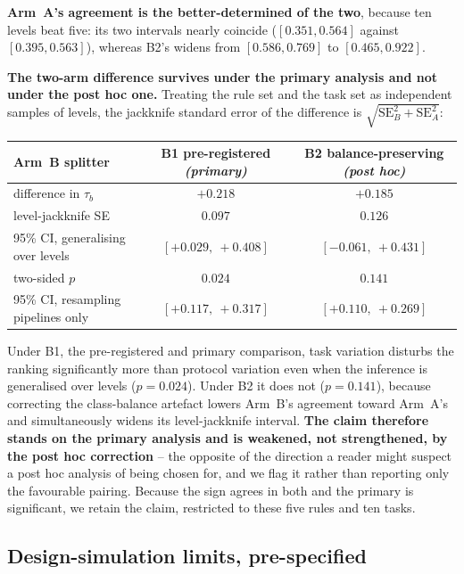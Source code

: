 \documentclass[11pt,a4paper]{article}
\begin{document}
\textbf{Arm~A's agreement is the better-determined of the two}, because ten levels beat
five: its two intervals nearly coincide ($[0.351, 0.564]$ against $[0.395, 0.563]$),
whereas B2's widens from $[0.586, 0.769]$ to $[0.465, 0.922]$.

\textbf{The two-arm difference survives under the primary analysis and not under the post
hoc one.} Treating the rule set and the task set as independent samples of levels, the
jackknife standard error of the difference is $\sqrt{\mathrm{SE}_B^2 + \mathrm{SE}_A^2}$:

\begin{center}\small
\begin{tabular}{lcc}
\toprule
Arm~B splitter & \textbf{B1} pre-registered \emph{(primary)} & B2 balance-preserving \emph{(post hoc)} \\
\midrule
difference in $\tau_b$                  & $+0.218$ & $+0.185$ \\
level-jackknife SE                      & $0.097$  & $0.126$ \\
95\% CI, generalising over levels       & $[+0.029,\ +0.408]$ & $[-0.061,\ +0.431]$ \\
two-sided $p$                           & $\mathbf{0.024}$ & $0.141$ \\
\midrule
95\% CI, resampling pipelines only      & $[+0.117,\ +0.317]$ & $[+0.110,\ +0.269]$ \\
\bottomrule
\end{tabular}
\end{center}

\noindent Under B1, the pre-registered and primary comparison, task variation disturbs the
ranking significantly more than protocol variation even when the inference is generalised
over levels ($p = 0.024$). Under B2 it does not ($p = 0.141$), because correcting the
class-balance artefact lowers Arm~B's agreement toward Arm~A's and simultaneously widens
its level-jackknife interval. \textbf{The claim therefore stands on the primary analysis
and is weakened, not strengthened, by the post hoc correction} -- the opposite of the
direction a reader might suspect a post hoc analysis of being chosen for, and we flag it
rather than reporting only the favourable pairing. Because the sign agrees in both and the
primary is significant, we retain the claim, restricted to these five rules and ten tasks.

\subsection{Design-simulation limits, pre-specified}
\end{document}
